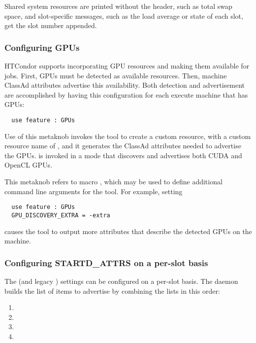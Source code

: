 Shared system resources are printed without the header,
such as total swap space,
and slot-specific messages,
such as the load average or state of each slot,
get the slot number appended.  

\subsubsection{\label{sec:GPU-resources}
Configuring GPUs}
HTCondor supports incorporating GPU resources and making them available 
for jobs.
First, GPUs must be detected as available resources.
Then, machine ClassAd attributes advertise this availability.
Both detection and advertisement are accomplished by having
this configuration for each execute machine that has GPUs:
\begin{verbatim}
  use feature : GPUs
\end{verbatim}

Use of this metaknob invokes the  tool
to create a custom resource, with a custom
resource name of ,
and it generates the ClassAd attributes needed to advertise the GPUs.
 is invoked in a mode that discovers 
and advertises both CUDA and OpenCL GPUs.

This metaknob refers to macro ,
which may be used to define additional command line arguments 
for the  tool.
For example, setting 
\begin{verbatim}
  use feature : GPUs
  GPU_DISCOVERY_EXTRA = -extra
\end{verbatim}
causes the  tool to output more attributes that
describe the detected GPUs on the machine.

\subsubsection{\label{sec:SMP-exprs}
Configuring STARTD\_ATTRS on a per-slot basis}

The  (and legacy ) settings
can be configured on a per-slot basis.
The  daemon builds the list of items to
advertise by combining the lists in this order:
\begin{enumerate}
\item{}
\item{}
\item{}
\item{}
\end{enumerate}

